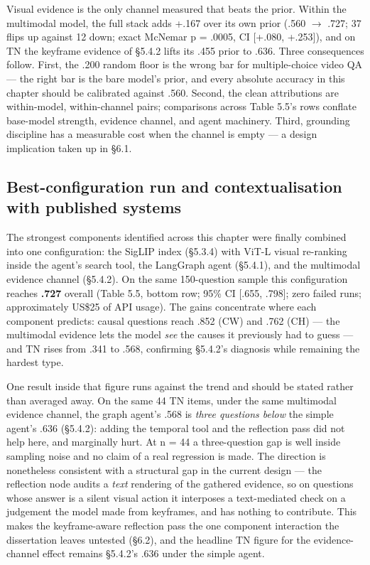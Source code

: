 Visual evidence is the only channel measured that beats the prior.
Within the multimodal model, the full stack adds +.167 over its own
prior (.560 \ensuremath{\rightarrow} .727; 37 flips up against 12 down;
exact McNemar p = .0005, CI {[}+.080, +.253{]}), and on TN the keyframe
evidence of §5.4.2 lifts its .455 prior to .636. Three consequences
follow. First, the .200 random floor is the wrong bar for
multiple-choice video QA --- the right bar is the bare model's prior,
and every absolute accuracy in this chapter should be calibrated against
.560. Second, the clean attributions are within-model, within-channel
pairs; comparisons across Table 5.5's rows conflate base-model strength,
evidence channel, and agent machinery. Third, grounding discipline has a
measurable cost when the channel is empty --- a design implication taken
up in §6.1.

\subsection{Best-configuration run and contextualisation with published
systems}

The strongest components identified across this chapter were finally
combined into one configuration: the SigLIP index (§5.3.4) with ViT-L
visual re-ranking inside the agent's search tool, the LangGraph agent
(§5.4.1), and the multimodal evidence channel (§5.4.2). On the same
150-question sample this configuration reaches \textbf{.727} overall
(Table 5.5, bottom row; 95\% CI {[}.655, .798{]}; zero failed runs;
approximately US\$25 of API usage). The gains concentrate where each
component predicts: causal questions reach .852 (CW) and .762 (CH) ---
the multimodal evidence lets the model \emph{see} the causes it
previously had to guess --- and TN rises from .341 to .568, confirming
§5.4.2's diagnosis while remaining the hardest type.

One result inside that figure runs against the trend and should be
stated rather than averaged away. On the same 44 TN items, under the
same multimodal evidence channel, the graph agent's .568 is \emph{three
questions below} the simple agent's .636 (§5.4.2): adding the temporal
tool and the reflection pass did not help here, and marginally hurt. At
n = 44 a three-question gap is well inside sampling noise and no claim
of a real regression is made. The direction is nonetheless consistent
with a structural gap in the current design --- the reflection node
audits a \emph{text} rendering of the gathered evidence, so on questions
whose answer is a silent visual action it interposes a text-mediated
check on a judgement the model made from keyframes, and has nothing to
contribute. This makes the keyframe-aware reflection pass the one
component interaction the dissertation leaves untested (§6.2), and the
headline TN figure for the evidence-channel effect remains §5.4.2's .636
under the simple agent.


